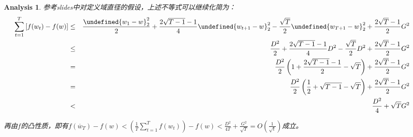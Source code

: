 \documentclass[a4paper,UTF8]{article}
\let\norm\undefined %
\DeclarePairedDelimiter\norm{\lVert}{\rVert}
\numberwithin{equation}{section}
\newtheorem*{myAnalysis}{Analysis}
\begin{document}
\begin{myAnalysis}
参考slides中对定义域直径的假设，上述不等式可以继续化简为：
\begin{eqnarray*}
\sum_{t=1}^T \left[ f(w_t) - f(w) \right] &\le& \frac{\norm{w_1 - w}_2^2}{2} + \frac{2\sqrt{T-1} -1}{4}  \norm{w_{t+1} - w}_2^2 - \frac{\sqrt{T}}{2}\norm{w_{T+1} - w}_2^2 + \frac{2\sqrt{T} - 1}{2} G^2 \\
&\le& \frac{D^2}{2} + \frac{2\sqrt{T-1} -1}{4}  D^2 - \frac{\sqrt{T}}{2}D^2 + \frac{2\sqrt{T} - 1}{2} G^2 \\
&=& \frac{D^2}{2} \left( 1 + \frac{2\sqrt{T-1} -1}{2} - \sqrt{T} \right) + \frac{2\sqrt{T} - 1}{2} G^2 \\
&=& \frac{D^2}{2} \left( \frac{1}{2} + \sqrt{T-1} - \sqrt{T} \right) + \frac{2\sqrt{T} - 1}{2} G^2 \\
&<& \frac{D^2}{4} + \sqrt{T}G^2
\end{eqnarray*}

再由$f$的凸性质，即有$f(\overline{w}_T) - f(w) < \left( \frac{1}{T} \sum_{t=1}^T f(w_t) \right) - f(w) < \frac{D^2}{4T} + \frac{G^2}{\sqrt{T}} = O\left(\frac{1}{\sqrt{t}}\right)$成立。

	~\\
	~\\
	~\\
	~\\	
	~\\
\end{myAnalysis}


\newpage
\end{document}

